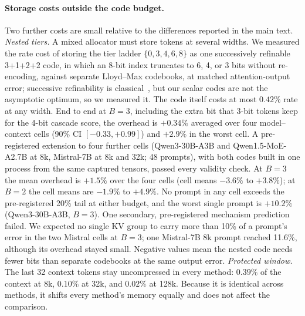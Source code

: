 \paragraph{Storage costs outside the code budget.}
Two further costs are small relative to the differences reported in the main
text.  \emph{Nested tiers.}  A mixed allocator must store tokens at several
widths.  We measured the rate cost of storing the tier ladder
$\{0,3,4,6,8\}$ as one successively refinable 3+1+2+2 code, in which an 8-bit
index truncates to 6, 4, or 3 bits without re-encoding, against separate
Lloyd--Max codebooks, at matched attention-output error; successive refinability is classical~\citep{equitz1991successive}, but our scalar codes are not the asymptotic optimum, so we measured it.  The code itself costs
at most $0.42\%$ rate at any width.  End to end at $B=3$, including the extra
bit that 3-bit tokens keep for the 4-bit cascade score, the overhead is
$+0.34\%$ averaged over four model--context cells (90\% CI $[-0.33,+0.99]$) and
$+2.9\%$ in the worst cell.  A pre-registered extension to four further
cells (Qwen3-30B-A3B and Qwen1.5-MoE-A2.7B at 8k, Mistral-7B at 8k and 32k;
48 prompts), with both codes built in one process from the same captured
tensors, passed every validity check.  At $B=3$ the mean overhead is $+1.5\%$
over the four cells (cell means $-3.6\%$ to $+3.8\%$); at $B=2$ the cell means
are $-1.9\%$ to $+4.9\%$.  No prompt in any cell exceeds the pre-registered
20\% tail at either budget, and the worst single prompt is $+10.2\%$
(Qwen3-30B-A3B, $B=3$).  One secondary, pre-registered mechanism prediction
failed.  We expected no single KV group to carry more than 10\% of a prompt's
error in the two Mistral cells at $B=3$; one Mistral-7B 8k prompt reached
11.6\%, although its overhead stayed small.  Negative values mean the nested code needs fewer bits than
separate codebooks at the same output error.  \emph{Protected window.}  The last 32 context
tokens stay uncompressed in every method: $0.39\%$ of the context at 8k,
$0.10\%$ at 32k, and $0.02\%$ at 128k.  Because it is identical across methods,
it shifts every method's memory equally and does not affect the comparison.

